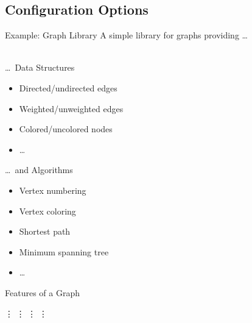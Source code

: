 \subsection{Configuration Options}


\begin{frame}{Example: Graph Library}
	A simple library for graphs providing \ldots\\~\\
	\begin{mycolumns}[t]
		\begin{example}{\ldots\ Data Structures}
			\begin{itemize}
				\item Directed/undirected edges
				\item Weighted/unweighted edges 
				\item Colored/uncolored nodes
				\item \ldots
			\end{itemize}
		\end{example}
	\mynextcolumn
		\begin{example}{\ldots\ and Algorithms}
			\begin{itemize}
				\item Vertex numbering
				\item Vertex coloring 
				\item Shortest path
				\item Minimum spanning tree 
				\item \ldots
			\end{itemize}
		\end{example}
	\end{mycolumns}
\end{frame}

\begin{frame}{Features of a Graph}
	\begin{mycolumns}[t,columns=4]
		\centering\Huge\vdots
	\mynextcolumn
		\centering\Huge\vdots
	\mynextcolumn
		\centering\Huge\vdots
	\mynextcolumn
		\centering\Huge\vdots
	\end{mycolumns}
\end{frame}

